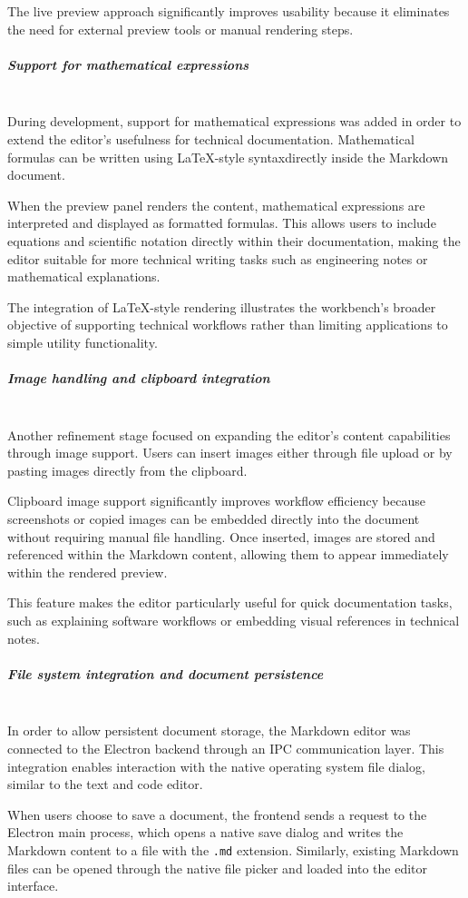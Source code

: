 \documentclass[a4paper,12pt]{article}
\begin{document}
The live preview approach significantly improves usability because it eliminates the need for external preview tools or manual rendering steps.

\subparagraph{Support for mathematical expressions}\mbox{} \\
During development, support for mathematical expressions was added in order to extend the editor’s usefulness for technical documentation. Mathematical formulas can be written using LaTeX-style syntax\cite{katex}directly inside the Markdown\cite{reactmarkdown} document.

When the preview panel renders the content, mathematical expressions are interpreted and displayed as formatted formulas. This allows users to include equations and scientific notation\cite{remarkmath} directly within their documentation, making the editor suitable for more technical writing tasks such as engineering notes or mathematical explanations.

The integration of LaTeX-style rendering illustrates the workbench’s broader objective of supporting technical workflows rather than limiting applications to simple utility functionality.

\subparagraph{Image handling and clipboard integration}\mbox{} \\
Another refinement stage focused on expanding the editor’s content capabilities through image support. Users can insert images either through file upload or by pasting images directly from the clipboard.

Clipboard image support significantly improves workflow efficiency because screenshots or copied images can be embedded directly into the document without requiring manual file handling. Once inserted, images are stored and referenced within the Markdown content, allowing them to appear immediately within the rendered preview.

This feature makes the editor particularly useful for quick documentation tasks, such as explaining software workflows or embedding visual references in technical notes.

\newpage
\subparagraph{File system integration and document persistence}\mbox{} \\
In order to allow persistent document storage, the Markdown editor was connected to the Electron backend through an IPC communication layer. 
This integration enables interaction with the native operating system file dialog, similar to the text and code editor.

When users choose to save a document, the frontend sends a request to the Electron main process, which opens a native save dialog and writes the Markdown content to a file with the \texttt{.md} extension. Similarly, existing Markdown files can be opened through the native file picker and loaded into the editor interface.
\end{document}
